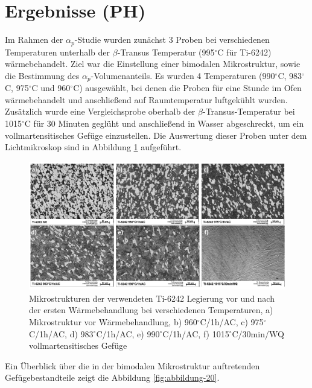 \section{Ergebnisse (PH)}

Im Rahmen der $\alpha_p$-Studie wurden zunächst 3 Proben bei verschiedenen Temperaturen unterhalb der $\beta$-Transus Temperatur (995$^\circ$C für Ti-6242) wärmebehandelt. Ziel war die Einstellung einer bimodalen Mikrostruktur, sowie die Bestimmung des $\alpha_p$-Volumenanteils. Es wurden 4 Temperaturen (990$^\circ$C, 983$^\circ$C, 975$^\circ$C und 960$^\circ$C) ausgewählt, bei denen die Proben für eine Stunde im Ofen wärmebehandelt und anschließend auf Raumtemperatur luftgekühlt wurden. Zusätzlich wurde eine Vergleichsprobe oberhalb der $\beta$-Transus-Temperatur bei 1015$^\circ$C für 30 Minuten geglüht und anschließend in Wasser abgeschreckt, um ein vollmartensitisches Gefüge einzustellen. Die Auswertung dieser Proben unter dem Lichtmikroskop sind in Abbildung \ref{fig:abbildung-8} aufgeführt. 

\begin{figure}
	\centering
	\includegraphics[width=1.0\linewidth]{./Bilder/Abbildung 8}
	\caption[Abbildung 8]{Mikrostrukturen der verwendeten Ti-6242 Legierung vor und nach der ersten Wärmebehandlung bei verschiedenen Temperaturen, a) Mikrostruktur vor Wärmebehandlung, b) 960$^\circ$C/1h/AC, c) 975$^\circ$C/1h/AC, d) 983$^\circ$C/1h/AC, e) 990$^\circ$C/1h/AC, f) 1015$^\circ$C/30min/WQ vollmartensitisches Gefüge}
	\label{fig:abbildung-8}
\end{figure}

Ein Überblick über die in der bimodalen Mikrostruktur auftretenden Gefügebestandteile zeigt die Abbildung \ref{fig:abbildung-20}.

